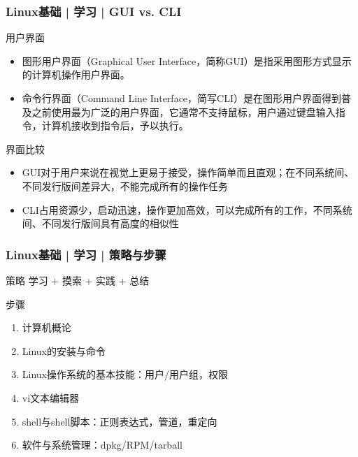 \begin{frame}
  \frametitle{Linux基础 | 学习 | GUI vs. CLI}
  \begin{block}{\alert{用户界面}}
    \begin{itemize}[<+->]
      \item 图形用户界面（Graphical User Interface，简称GUI）是指采用图形方式显示的计算机操作用户界面。
      \item 命令行界面（Command Line Interface，简写CLI）是在图形用户界面得到普及之前使用最为广泛的用户界面，它通常不支持鼠标，用户通过键盘输入指令，计算机接收到指令后，予以执行。
    \end{itemize}
  \end{block}
  \pause
  \begin{block}{界面比较}
    \begin{itemize}
      \item GUI对于用户来说在视觉上更易于接受，操作简单而且直观；在不同系统间、不同发行版间差异大，不能完成所有的操作任务
      \item CLI占用资源少，启动迅速，操作更加高效，可以完成所有的工作，不同系统间、不同发行版间具有高度的相似性
    \end{itemize}
  \end{block}
  \pause
\end{frame}

\begin{frame}
  \frametitle{Linux基础 | 学习 | 策略与步骤}
  \begin{block}{策略}
    学习 + 摸索 + 实践 + 总结
  \end{block}
  \pause
  \begin{block}{步骤}
    \begin{enumerate}[<+->]
      \item 计算机概论
      \item Linux的安装与命令
      \item Linux操作系统的基本技能：用户/用户组，权限
      \item vi文本编辑器
      \item shell与shell脚本：正则表达式，管道，重定向
      \item 软件与系统管理：dpkg/RPM/tarball
    \end{enumerate}
  \end{block}
\end{frame}

